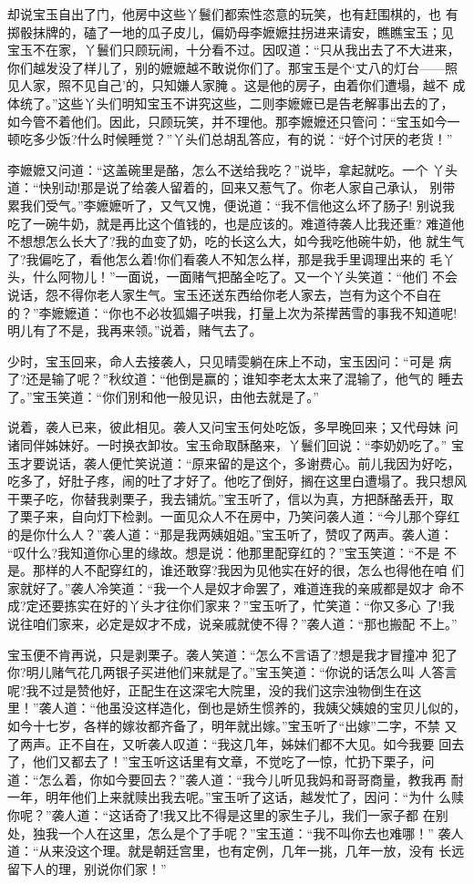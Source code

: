 却说宝玉自出了门，他房中这些丫鬟们都索性恣意的玩笑，也有赶围棋的，也
有掷骰抹牌的，磕了一地的瓜子皮儿，偏奶母李嬷嬷拄拐进来请安，瞧瞧宝玉；见
宝玉不在家，丫鬟们只顾玩闹，十分看不过。因叹道：“只从我出去了不大进来，
你们越发没了样儿了，别的嬷嬷越不敢说你们了。那宝玉是个‘丈八的灯台——照
见人家，照不见自己’的，只知嫌人家腌。这是他的房子，由着你们遭塌，越不
成体统了。”这些丫头们明知宝玉不讲究这些，二则李嬷嬷已是告老解事出去的了，
如今管不着他们。因此，只顾玩笑，并不理他。那李嬷嬷还只管问：“宝玉如今一
顿吃多少饭?什么时候睡觉？”丫头们总胡乱答应，有的说：“好个讨厌的老货！”

李嬷嬷又问道：“这盖碗里是酪，怎么不送给我吃？”说毕，拿起就吃。一个
丫头道：“快别动!那是说了给袭人留着的，回来又惹气了。你老人家自己承认，
别带累我们受气。”李嬷嬷听了，又气又愧，便说道：“我不信他这么坏了肠子!
别说我吃了一碗牛奶，就是再比这个值钱的，也是应该的。难道待袭人比我还重?
难道他不想想怎么长大了?我的血变了奶，吃的长这么大，如今我吃他碗牛奶，他
就生气了?我偏吃了，看他怎么着!你们看袭人不知怎么样，那是我手里调理出来的
毛丫头，什么阿物儿！”一面说，一面赌气把酪全吃了。又一个丫头笑道：“他们
不会说话，怨不得你老人家生气。宝玉还送东西给你老人家去，岂有为这个不自在
的？”李嬷嬷道：“你也不必妆狐媚子哄我，打量上次为茶撵茜雪的事我不知道呢!
明儿有了不是，我再来领。”说着，赌气去了。

少时，宝玉回来，命人去接袭人，只见晴雯躺在床上不动，宝玉因问：“可是
病了?还是输了呢？”秋纹道：“他倒是赢的；谁知李老太太来了混输了，他气的
睡去了。”宝玉笑道：“你们别和他一般见识，由他去就是了。”

说着，袭人已来，彼此相见。袭人又问宝玉何处吃饭，多早晚回来；又代母妹
问诸同伴姊妹好。一时换衣卸妆。宝玉命取酥酪来，丫鬟们回说：“李奶奶吃了。”
宝玉才要说话，袭人便忙笑说道：“原来留的是这个，多谢费心。前儿我因为好吃，
吃多了，好肚子疼，闹的吐了才好了。他吃了倒好，搁在这里白遭塌了。我只想风
干栗子吃，你替我剥栗子，我去铺炕。”宝玉听了，信以为真，方把酥酪丢开，取
了栗子来，自向灯下检剥。一面见众人不在房中，乃笑问袭人道：“今儿那个穿红
的是你什么人？”袭人道：“那是我两姨姐姐。”宝玉听了，赞叹了两声。袭人道：
“叹什么?我知道你心里的缘故。想是说：他那里配穿红的？”宝玉笑道：“不是
不是。那样的人不配穿红的，谁还敢穿?我因为见他实在好的很，怎么也得他在咱
们家就好了。”袭人冷笑道：“我一个人是奴才命罢了，难道连我的亲戚都是奴才
命不成?定还要拣实在好的丫头才往你们家来？”宝玉听了，忙笑道：“你又多心
了!我说往咱们家来，必定是奴才不成，说亲戚就使不得？”袭人道：“那也搬配
不上。”

宝玉便不肯再说，只是剥栗子。袭人笑道：“怎么不言语了?想是我才冒撞冲
犯了你?明儿赌气花几两银子买进他们来就是了。”宝玉笑道：“你说的话怎么叫
人答言呢?我不过是赞他好，正配生在这深宅大院里，没的我们这宗浊物倒生在这
里！”袭人道：“他虽没这样造化，倒也是娇生惯养的，我姨父姨娘的宝贝儿似的，
如今十七岁，各样的嫁妆都齐备了，明年就出嫁。”宝玉听了“出嫁”二字，不禁
又了两声。正不自在，又听袭人叹道：“我这几年，姊妹们都不大见。如今我要
回去了，他们又都去了！”宝玉听这话里有文章，不觉吃了一惊，忙扔下栗子，问
道：“怎么着，你如今要回去？”袭人道：“我今儿听见我妈和哥哥商量，教我再
耐一年，明年他们上来就赎出我去呢。”宝玉听了这话，越发忙了，因问：“为什
么赎你呢？”袭人道：“这话奇了!我又比不得是这里的家生子儿，我们一家子都
在别处，独我一个人在这里，怎么是个了手呢？”宝玉道：“我不叫你去也难哪！”
袭人道：“从来没这个理。就是朝廷宫里，也有定例，几年一挑，几年一放，没有
长远留下人的理，别说你们家！”

